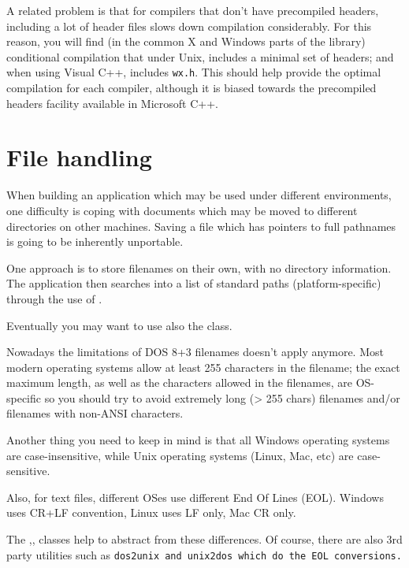 A related problem is that for compilers that don't have precompiled
headers, including a lot of header files slows down compilation
considerably. For this reason, you will find (in the common
X and Windows parts of the library) conditional
compilation that under Unix, includes a minimal set of headers;
and when using Visual C++, includes {\tt wx.h}. This should help provide
the optimal compilation for each compiler, although it is
biased towards the precompiled headers facility available
in Microsoft C++.

\section{File handling}\label{filehandling}

When building an application which may be used under different
environments, one difficulty is coping with documents which may be
moved to different directories on other machines. Saving a file which
has pointers to full pathnames is going to be inherently unportable. 

One approach is to store filenames on their own, with no directory
information. The application then searches into a list of standard
paths (platform-specific) through the use of .

Eventually you may want to use also the  class.

Nowadays the limitations of DOS 8+3 filenames doesn't apply anymore.
Most modern operating systems allow at least 255 characters in the filename;
the exact maximum length, as well as the characters allowed in the filenames, 
are OS-specific so you should try to avoid extremely long (> 255 chars) filenames
and/or filenames with non-ANSI characters.

Another thing you need to keep in mind is that all Windows operating systems
are case-insensitive, while Unix operating systems (Linux, Mac, etc) are
case-sensitive.

Also, for text files, different OSes use different End Of Lines (EOL).
Windows uses CR+LF convention, Linux uses LF only, Mac CR only.

The ,,
 classes help to abstract
from these differences.
Of course, there are also 3rd party utilities such as \tt{dos2unix} and \tt{unix2dos}
which do the EOL conversions.

